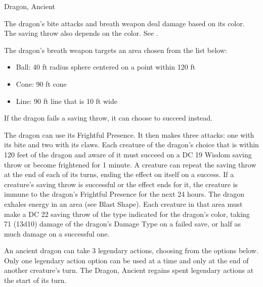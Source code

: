 \begin{DndMonster}[width=\textwidth + 8pt]{Dragon, Ancient}
\begin{multicols}{2}
 The dragon's bite attacks and breath weapon deal damage based on its color. The saving throw also depends on the color. See .

 The dragon's breath weapon targets an area chosen from the list below:
\begin{itemize}
	\item[]Ball: 40 ft radius sphere centered on a point within 120 ft
	\item[]Cone: 90 ft cone
	\item[]Line: 90 ft line that is 10 ft wide
\end{itemize}

 If the dragon fails a saving throw, it can choose to succeed instead.

 The dragon can use its Frightful Presence. It then makes three attacks: one with its bite and two with its claws.
\DndMonsterAttack[
	name=Bite,
	distance=melee,
	type=weapon,
	mod=+15,
	reach=15,
	dmg=\DndDice{2d10 + 8},
	dmg-type=piercing,
	extra={ plus 9 (2d8) damage of the dragon's Damage Type.}
]
\DndMonsterAttack[
	name=Claw,
	distance=melee,
	type=weapon,
	mod=+15,
	reach=10,
	dmg=\DndDice{2d6 + 8},
	dmg-type=slashing
]
\DndMonsterAttack[
	name=Tail,
	distance=melee,
	type=weapon,
	mod=+15,
	reach=20,
	dmg=\DndDice{2d8 + 8},
	dmg-type=bludgeoning
]
Each creature of the dragon's choice that is within 120 feet of the dragon and aware of it must succeed on a DC 19 Wisdom saving throw or become frightened for 1 minute. A creature can repeat the saving throw at the end of each of its turns, ending the effect on itself on a success. If a creature's saving throw is successful or the effect ends for it, the creature is immune to the dragon's Frightful Presence for the next 24 hours.
The dragon exhales energy in an area (see Blast Shape). Each creature in that area must make a DC 22 saving throw of the type indicated for the dragon's color, taking 71 (13d10) damage of the dragon's Damage Type on a failed save, or half as much damage on a successful one.

An ancient dragon can take 3 legendary actions, choosing from the options below. Only one legendary action option can be used at a time and only at the end of another creature's turn. The Dragon, Ancient regains spent legendary actions at the start of its turn.
\begin{DndMonsterLegendaryActions}
\end{DndMonsterLegendaryActions}

\end{multicols}
\end{DndMonster}
